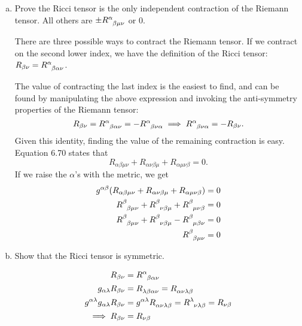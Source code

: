 \documentclass[gr-notes.tex]{subfiles}
\begin{document}
\begin{enumerate}[(a)]
\item Prove the Ricci tensor is the only independent contraction of the Riemann tensor. All others are $\pm \tensor{R}{^\alpha_{\beta\mu\nu}}$ or $0$.

There are three possible ways to contract the Riemann tensor. If we contract on the second lower index, we have the definition of the Ricci tensor: $R_{\beta\nu} = \tensor{R}{^\alpha_{\beta\alpha\nu}}$.

The value of contracting the last index is the easiest to find, and can be found by manipulating the above expression and invoking the anti-symmetry properties of the Riemann tensor:
%
\begin{displaymath}
  R_{\beta\nu} =
  \tensor{R}{^\alpha_{\beta\alpha\nu}} =
 -\tensor{R}{^\alpha_{\beta\nu\alpha}}
  \implies
  \tensor{R}{^\alpha_{\beta\nu\alpha}} =
 -R_{\beta\nu}.
\end{displaymath}
%
Given this identity, finding the value of the remaining contraction is easy. Equation 6.70 states that
%
\begin{displaymath}
  R_{\alpha\beta\mu\nu} + R_{\alpha\nu\beta\mu} + R_{\alpha\mu\nu\beta} = 0.
\end{displaymath}
%
If we raise the $\alpha$'s with the metric, we get
%
\begin{align*}
  g^{\alpha\beta}
  (R_{\alpha\beta\mu\nu} + R_{\alpha\nu\beta\mu} + R_{\alpha\mu\nu\beta}) &=
  0
  \\
  \tensor{R}{^\beta_{\beta\mu\nu}} +
  \tensor{R}{^\beta_{\nu\beta\mu}} +
  \tensor{R}{^\beta_{\mu\nu\beta}} &=
  0
  \\
  \tensor{R}{^\beta_{\beta\mu\nu}} +
  \tensor{R}{^\beta_{\nu\beta\mu}} -
  \tensor{R}{^\beta_{\mu\beta\nu}} &=
  0
  \\
  \tensor{R}{^\beta_{\beta\mu\nu}} &=
  0
\end{align*}


\item Show that the Ricci tensor is symmetric.

\begin{align*}
  R_{\beta\nu} &=
  \tensor{R}{^\alpha_{\beta\alpha\nu}}
  \\
  g_{\alpha\lambda} R_{\beta\nu} &=
  \tensor{R}{_{\lambda\beta\alpha\nu}} =
  \tensor{R}{_{\alpha\nu\lambda\beta}}
  \\
  g^{\alpha\lambda} g_{\alpha\lambda} R_{\beta\nu} &=
  g^{\alpha\lambda} \tensor{R}{_{\alpha\nu\lambda\beta}} =
  \tensor{R}{^\lambda_{\nu\lambda\beta}} = R_{\nu\beta}
  \\ \implies
  R_{\beta\nu} &= R_{\nu\beta}
\end{align*}


\end{enumerate}
\end{document}
